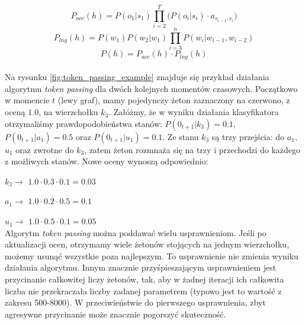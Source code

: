 \documentclass[a4paper,11pt,onecolumn,twoside,openright,titlepage]{article}
\begin{document}
		\begin{equation}
			P_{acc}(h) = P(o_1|s_1) \prod_{i=2}^T \bigg( P(o_i|s_i) \cdot a_{s_{i-1},s_i} \bigg)
		\end{equation}
		\begin{equation}
			P_{lng}(h) = P(w_1)P(w_2|w_1)\prod_{i=3}^nP(w_i|w_{i-1},w_{i-2})
		\end{equation}
		\begin{equation}
			P(h) = P_{acc}(h) \cdot P_{lng}(h)
			\label{eqn:h_score}
		\end{equation}
		\\
		Na rysunku \ref{fig:token_passing_example} znajduje się przykład działania algorytmu \textit{token passing} dla dwóch kolejnych momentów czasowych. Początkowo w momencie $t$ (lewy graf), mamy pojedynczy żeton zaznaczony na czerwono, z oceną $1.0$, na wierzchołku $k_3$. Załóżmy, że w wyniku działania klasyfikatora otrzymaliśmy prawdopodobieństwa stanów: $P(0_{t+1}|k_3)=0.1$, $P(0_{t+1}|a_1)=0.5$ oraz $P(0_{t+1}|u_1)=0.1$. Ze stanu $k_3$ są trzy przejścia: do $a_1$, $u_1$ oraz zwrotne do $k_3$, zatem żeton rozmnaża się na trzy i przechodzi do każdego z możliwych stanów. Nowe oceny wynoszą odpowiednio: 
		
		$k_3 \longrightarrow$ $1.0 \cdot 0.3 \cdot 0.1 = 0.03$
		
		$a_1 \longrightarrow$ $1.0 \cdot 0.2 \cdot 0.5 = 0.1$
		
		$u_1 \longrightarrow$ $1.0 \cdot 0.5 \cdot 0.1 = 0.05$
		\\
		Algorytm \textit{token passing} można poddawać wielu usprawnieniom. Jeśli po aktualizacji ocen, otrzymamy wiele żetonów stojących na jednym wierzchołku, możemy usunąć wszystkie poza najlepszym. To usprawnienie nie zmienia wyniku działania algorytmu. Innym znacznie przyśpieszającym usprawnieniem jest przycinanie całkowitej liczy żetonów, tak, aby w żadnej iteracji ich całkowita liczba nie przekraczała liczby zadanej parametrem (typowo jest to wartość z zakresu 500-8000). W przeciwieństwie do pierwszego usprawnienia, zbyt agresywne przycinanie może znacznie pogorszyć skuteczność.
		
\end{document}
